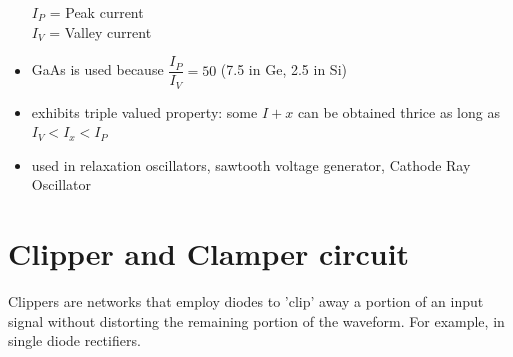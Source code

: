 \documentclass[10pt, a4paper]{report}
\begin{document}
\begin{itemize}
		$ I_P $ = Peak current \\ $ I_V $ = Valley current
		\item GaAs is used because $ \dfrac{I_P}{I_V}  = 50$ (7.5 in Ge, 2.5 in Si)
		\item exhibits triple valued property: some $ I+x $ can be obtained thrice as long as $ I_V < I_x < I_P $
		\item used in relaxation oscillators, sawtooth voltage generator, Cathode Ray Oscillator
	\end{itemize}

	\section{Clipper and Clamper circuit}
	Clippers are networks that employ diodes to 'clip' away a portion of an input signal without distorting the remaining portion of the waveform. For example, in single diode rectifiers.
\end{document}
